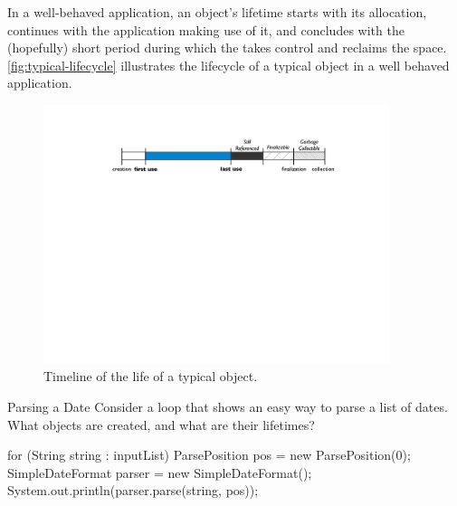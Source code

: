 
In a well-behaved application, an object's lifetime starts with its allocation,
continues with the application making use of it, and concludes with the
(hopefully) short period during which the \jre takes control and reclaims the
space. \autoref{fig:typical-lifecycle} illustrates the lifecycle of a typical
object in a well behaved application.

\begin{figure}
	\includegraphics[width=0.9\textwidth]{part2/Figures/lifetime/object-lifecycle}
	\caption{Timeline of the life of a typical object.}
	\label{fig:typical-lifecycle}
\end{figure}


\begin{example}{Parsing a Date} Consider a loop that shows an easy way to parse
a list of dates. What objects are created, and what are their lifetimes?
\begin{shortlisting}
for (String string : inputList) {
	ParsePosition pos = new ParsePosition(0);
	SimpleDateFormat parser = new SimpleDateFormat();
	System.out.println(parser.parse(string, pos));
}
\end{shortlisting}
\end{example}

